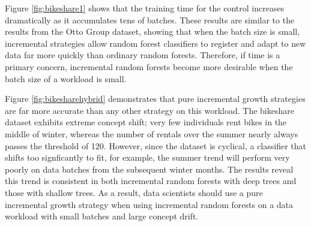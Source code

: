 Figure \ref{fig:bikeshare1} shows that the training time for the control
increases dramatically as it accumulates tens of batches. These results are
similar to the results from the Otto Group dataset, showing that when the batch
size is small, incremental strategies allow random forest classifiers to
register and adapt to new data far more quickly than ordinary random forests.
Therefore, if time is a primary concern, incremental random forests become more
desirable when the batch size of a workload is small.

Figure \ref{fig:bikesharehybrid} demonstrates that pure incremental growth
strategies are far more accurate than any other strategy on this workload. The
bikeshare dataset exhibits extreme concept shift; very few individuals rent
bikes in the middle of winter, whereas the number of rentals over the summer
nearly always passes the threshold of 120. However, since the dataset is
cyclical, a classifier that shifts too signficantly to fit, for example, the
summer trend will perform very poorly on data batches from the subsequent
winter months. The results reveal this trend is consistent in both incremental
random forests with deep trees and those with shallow trees. As a result, data
scientists should use a pure incremental growth strategy when using incremental
random forests on a data workload with small batches and large concept drift.


